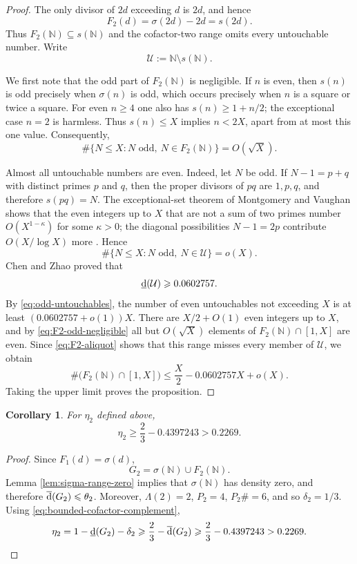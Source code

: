 \documentclass[11pt,letterpaper,reqno]{amsart}
\numberwithin{equation}{section}
\newtheorem{corollary}[theorem]{Corollary}
\theoremstyle{remark}
\newcommand{\N}{\mathbb{N}}
\newcommand{\lowerdens}{\underline{\textup{d}}}
\newcommand{\upperdens}{\overline{\textup{d}}}
\renewcommand{\leq}{\leqslant}
\renewcommand{\geq}{\geqslant}
\begin{document}
\begin{proof}
The only divisor of $2d$ exceeding $d$ is $2d$, and hence
\begin{equation}\label{eq:F2-aliquot}
 F_2(d)=\sigma(2d)-2d=s(2d).
\end{equation}
Thus $F_2(\N)\subseteq s(\N)$ and the cofactor-two range omits every
untouchable number. Write
\[
 \mathcal{U}:=\N\setminus s(\N).
\]

We first note that the odd part of $F_2(\N)$ is negligible. If $n$ is even,
then $s(n)$ is odd precisely when $\sigma(n)$ is odd, which occurs precisely
when $n$ is a square or twice a square. For even $n\geq4$ one also has
$s(n)\geq1+n/2$; the exceptional case $n=2$ is harmless. Thus $s(n)\leq X$
implies $n<2X$, apart from at most this one value. Consequently,
\begin{equation}\label{eq:F2-odd-negligible}
 \#\{N\leq X:N\text{ odd},\ N\in F_2(\N)\}=O(\sqrt X).
\end{equation}

Almost all untouchable numbers are even. Indeed, let $N$ be odd. If
$N-1=p+q$ with distinct primes $p$ and $q$, then the proper divisors of $pq$
are $1,p,q$, and therefore $s(pq)=N$. The exceptional-set theorem of
Montgomery and Vaughan shows that the even integers up to $X$ that are not a
sum of two primes number $O(X^{1-\kappa})$ for some $\kappa>0$; the diagonal
possibilities $N-1=2p$ contribute $O(X/\log X)$ more \cite{MVGoldbach}.
Hence
\begin{equation}\label{eq:odd-untouchables}
 \#\{N\leq X:N\text{ odd},\ N\in\mathcal{U}\}=o(X).
\end{equation}
Chen and Zhao proved \cite{ChenZhao} that
\[
 \lowerdens(\mathcal{U})\geq0.0602757.
\]
By \eqref{eq:odd-untouchables}, the number of even
untouchables not exceeding $X$ is at least
$(0.0602757+o(1))X$. There are $X/2+O(1)$ even integers up to $X$, and by
\eqref{eq:F2-odd-negligible} all but $O(\sqrt X)$ elements of
$F_2(\N)\cap[1,X]$ are even. Since \eqref{eq:F2-aliquot} shows that this
range misses every member of $\mathcal{U}$, we obtain
\[
 \#\bigl(F_2(\N)\cap[1,X]\bigr)
 \leq\frac X2-0.0602757X+o(X).
\]
Taking the upper limit proves the proposition.
\end{proof}

\begin{corollary}
For $\eta_2$ defined above,
\[
 \eta_2\geq\frac23-0.4397243>0.2269.
\]
\end{corollary}

\begin{proof}
Since $F_1(d)=\sigma(d)$,
\[
 G_2=\sigma(\N)\cup F_2(\N).
\]
Lemma \ref{lem:sigma-range-zero} implies that $\sigma(\N)$ has density
zero, and therefore $\upperdens(G_2)\leq\theta_2$. Moreover,
$\Lambda(2)=2$, $P_2=4$, $P_2\#=6$, and so $\delta_2=1/3$.
Using \eqref{eq:bounded-cofactor-complement},
\[
 \eta_2
 =1-\lowerdens(G_2)-\delta_2
 \geq\frac23-\upperdens(G_2)
 \geq\frac23-0.4397243>0.2269.
\qedhere \]
\end{proof}
\end{document}
